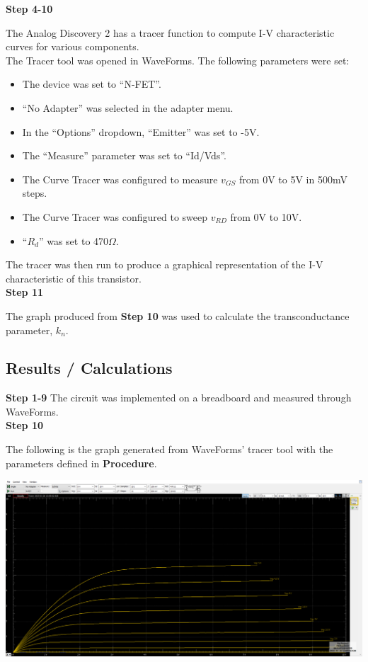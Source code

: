 \documentclass[notitlepage, 12pt]{report}  %
\begin{document}
\textbf{Step 4-10}

The Analog Discovery 2 has a tracer function to compute I-V characteristic curves for various components. \\

The Tracer tool was opened in WaveForms. The following parameters were set:

\begin{itemize}
    \item The device was set to ``N-FET''.
    \item ``No Adapter'' was selected in the adapter menu.
    \item In the ``Options'' dropdown, ``Emitter'' was set to -5V.
    \item The ``Measure'' parameter was set to ``Id/Vds''. 
    \item The Curve Tracer was configured to measure $v_{GS}$ from 0V to 5V in 500mV steps.
    \item The Curve Tracer was configured to sweep $v_{RD}$ from 0V to 10V. 
    \item ``$R_d$'' was set to 470$\Omega$. 
\end{itemize}


The tracer was then run to produce a graphical representation of the I-V characteristic of this transistor. \\

\textbf{Step 11}

The graph produced from \textbf{Step 10} was used to calculate the transconductance parameter, $k_n$. 

\subsection*{Results / Calculations}

\textbf{Step 1-9} 
The circuit was implemented on a breadboard and measured through WaveForms. \\

\textbf{Step 10}

The following is the graph generated from WaveForms' tracer tool with the parameters defined in \textbf{Procedure}. \\

\begin{center}
    \includegraphics[scale=0.5]{Task2_graph.png}
\end{center}
\end{document}
